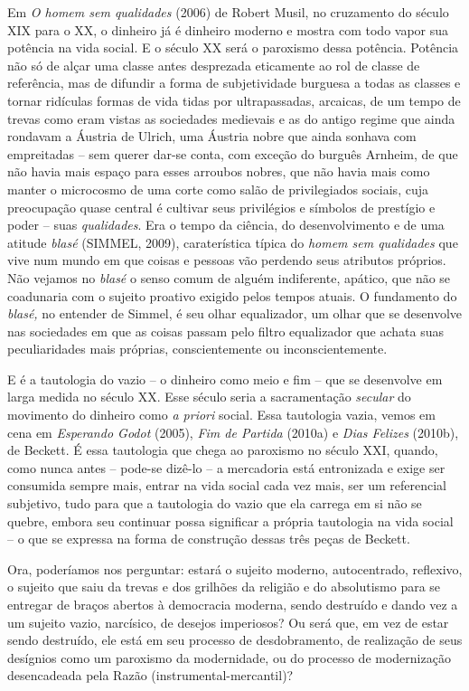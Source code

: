 Em \emph{O homem sem qualidades} (2006) de Robert Musil, no cruzamento
do século XIX para o XX, o dinheiro já é dinheiro moderno e mostra com
todo vapor sua potência na vida social. E o século XX será o paroxismo
dessa potência. Potência não só de alçar uma classe antes desprezada
eticamente ao rol de classe de referência, mas de difundir a forma de
subjetividade burguesa a todas as classes e tornar ridículas formas de
vida tidas por ultrapassadas, arcaicas, de um tempo de trevas como eram
vistas as sociedades medievais e as do antigo regime que ainda rondavam
a Áustria de Ulrich, uma Áustria nobre que ainda sonhava com empreitadas
-- sem querer dar-se conta, com exceção do burguês Arnheim, de que não
havia mais espaço para esses arroubos nobres, que não havia mais como
manter o microcosmo de uma corte como salão de privilegiados sociais,
cuja preocupação quase central é cultivar seus privilégios e símbolos de
prestígio e poder -- suas \emph{qualidades}. Era o tempo da ciência, do
desenvolvimento e de uma atitude \emph{blasé} (SIMMEL, 2009),
caraterística típica do \emph{homem sem qualidades} que vive num mundo
em que coisas e pessoas vão perdendo seus atributos próprios. Não
vejamos no \emph{blasé} o senso comum de alguém indiferente, apático,
que não se coadunaria com o sujeito proativo exigido pelos tempos
atuais. O fundamento do \emph{blasé,} no entender de Simmel, é seu olhar
equalizador, um olhar que se desenvolve nas sociedades em que as coisas
passam pelo filtro equalizador que achata suas peculiaridades mais
próprias, conscientemente ou inconscientemente.

E é a tautologia do vazio -- o dinheiro como meio e fim -- que se
desenvolve em larga medida no século XX. Esse século seria a
sacramentação \emph{secular} do movimento do dinheiro como \emph{a
priori} social. Essa tautologia vazia, vemos em cena em \emph{Esperando
Godot} (2005), \emph{Fim de Partida} (2010a) e \emph{Dias Felizes}
(2010b), de Beckett. É essa tautologia que chega ao paroxismo no século
XXI, quando, como nunca antes -- pode-se dizê-lo -- a mercadoria está
entronizada e exige ser consumida sempre mais, entrar na vida social
cada vez mais, ser um referencial subjetivo, tudo para que a tautologia
do vazio que ela carrega em si não se quebre, embora seu continuar possa
significar a própria tautologia na vida social -- o que se expressa na
forma de construção dessas três peças de Beckett.

Ora, poderíamos nos perguntar: estará o sujeito moderno, autocentrado,
reflexivo, o sujeito que saiu da trevas e dos grilhões da religião e do
absolutismo para se entregar de braços abertos à democracia moderna,
sendo destruído e dando vez a um sujeito vazio, narcísico, de desejos
imperiosos? Ou será que, em vez de estar sendo destruído, ele está em
seu processo de desdobramento, de realização de seus desígnios como um
paroxismo da modernidade, ou do processo de modernização desencadeada
pela Razão (instrumental-mercantil)?

